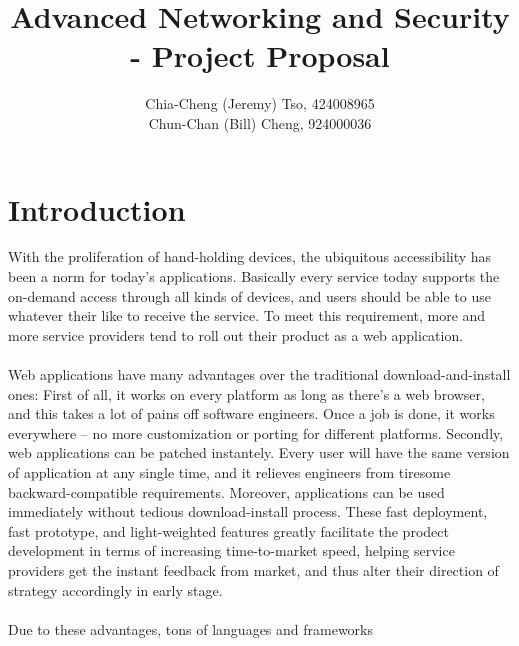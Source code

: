 \documentclass[12pt, a4paper]{article}
\title{
    Advanced Networking and Security\\
    - Project Proposal
    \vspace{-2ex}
}
\author{
    \normalfont \normalsize 
    Chia-Cheng (Jeremy) Tso, 
    424008965\\
    \vspace{-5ex}
    \normalfont \normalsize 
    Chun-Chan (Bill) Cheng, 
    924000036
    \vspace{-5ex}
}
\date{
    \normalfont \normalsize 
    \vspace{-9ex}
}
\begin{document}
\maketitle
%

\section{Introduction}
With the proliferation of hand-holding devices,
the ubiquitous accessibility has been a norm for today's applications.
Basically every service today supports the on-demand access through all kinds of devices,
and users should be able to use whatever their like to receive the service.
To meet this requirement, more and more service providers tend to roll
out their product as a
web application.
\\\\
Web applications have many advantages over the traditional download-and-install ones:
First of all, it works on every platform as long as there's a web browser, and
this takes a lot of pains off software engineers. Once a job is done, it works everywhere
-- no more customization or porting for different platforms.
Secondly, web applications can be patched instantely.
Every user will have the same version of application at any single time,
and it relieves engineers from
tiresome backward-compatible requirements.
Moreover,
applications can be used immediately without tedious download-install process.
These fast deployment, fast prototype, and light-weighted features
greatly facilitate the prodect development in terms of
increasing time-to-market speed,
helping service providers get the instant
feedback from market, and thus alter their direction of strategy accordingly in early stage.
\\\\
Due to these advantages, tons of languages and frameworks
\end{document}
